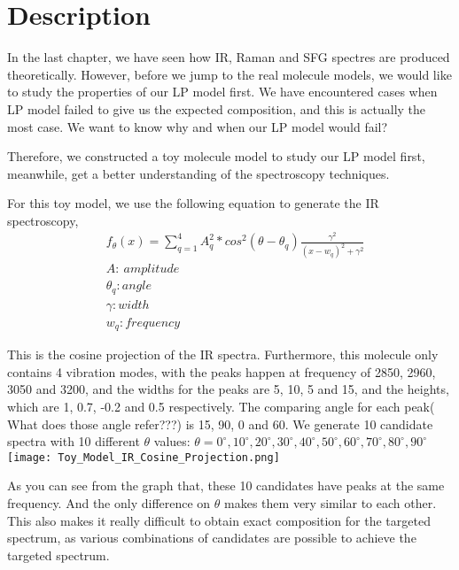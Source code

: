 \label{chapter:simplified_molecular_model}

\section{Description}
In the last chapter, we have seen how IR, Raman and SFG spectres are produced theoretically. However, before we jump to the real molecule models, we would like to study the properties of our LP model first. We have encountered cases when LP model failed to give us the expected composition, and this is actually the most case. We want to know why and when our LP model would fail?

Therefore, we constructed a toy molecule model to study our LP model first, meanwhile, get a better understanding of the spectroscopy techniques.

For this toy model, we use the following equation to generate the IR spectroscopy, 
\begin{eqnarray}
& f_{\theta}(x) = \displaystyle\sum^{4}_{q=1} A_q^2 * cos^2(\theta - \theta_q)\frac{\gamma^2}{(x- w_q)^2 + \gamma^2} \nonumber \\
& A:~amplitude \nonumber \\
& \theta_q : angle \nonumber \\
& \gamma: width \nonumber \\
& w_q : frequency \nonumber 
\end{eqnarray}

This is the cosine projection of the IR spectra. Furthermore, this molecule only contains 4 vibration modes, with the peaks happen at frequency of 2850, 2960, 3050 and 3200, and the widths for the peaks are 5, 10, 5 and 15, and the heights, which are 1, 0.7, -0.2 and 0.5 respectively. The comparing angle for each peak( What does those angle refer???) is 15, 90, 0 and 60. We generate 10 candidate spectra with 10 different $\theta$ values:
$\theta = 0^{\circ}, 10^{\circ}, 20^{\circ}, 30^{\circ}, 40^{\circ}, 50^{\circ}, 60^{\circ}, 70^{\circ}, 80^{\circ}, 90^{\circ} $ \\

\texttt{[image: Toy\_Model\_IR\_Cosine\_Projection.png]}

As you can see from the graph that, these 10 candidates have peaks at the same frequency. And the only difference on $\theta$ makes them very similar to each other. This also makes it really difficult to obtain exact composition for the targeted spectrum, as various combinations of candidates are possible to achieve the targeted spectrum.

